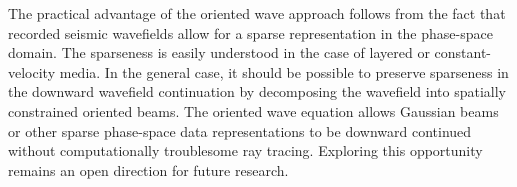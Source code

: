 The practical advantage of the oriented wave approach follows from the fact
that recorded seismic wavefields allow for a sparse representation in the
phase-space domain. The sparseness is easily understood in the case of layered
or constant-velocity media. In the general case, it should be possible to
preserve sparseness in the downward wavefield continuation by decomposing the
wavefield into spatially constrained oriented beams. %
The oriented
wave equation allows Gaussian beams \cite[]{GEO66-04-12401250} or other sparse
phase-space data representations to be downward continued without
computationally troublesome ray tracing. Exploring this opportunity remains an
open direction for future research.

 



